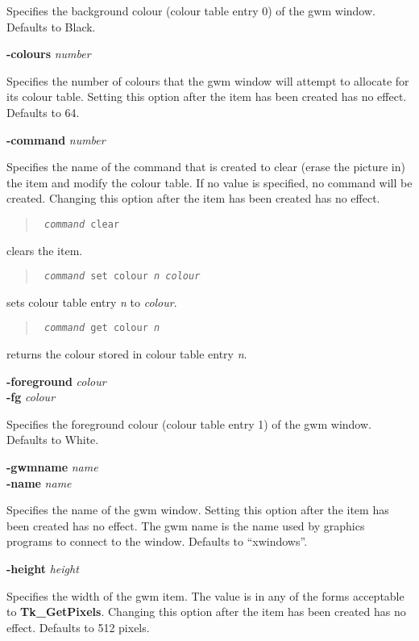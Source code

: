 \begin{rquote}
Specifies the background colour (colour table entry 0) of the gwm window.
Defaults to Black.
\end{rquote}

{\bf -colours} {\em number}
\begin{rquote}
Specifies the number of colours that the gwm window will attempt to allocate
for its colour table. Setting this option after the item has been created 
has no effect. Defaults to 64.
\end{rquote}

{\bf -command} {\em number}
\begin{rquote}
Specifies the name of the command that is created to clear (erase the picture
in) the item and modify the colour table. If no value is specified, no 
command will be created. Changing this option after the item has been created
has no effect.
\begin{quote}{\tt
{\em command} clear
}\end{quote}
clears the item.
\begin{quote}{\tt
{\em command} set colour {\em n} {\em colour}
}\end{quote}
sets colour table entry {\em n} to {\em colour}.
\begin{quote}{\tt
{\em command} get colour {\em n}
}\end{quote}
returns the colour stored in colour table entry {\em n}.
\end{rquote}

{\bf -foreground} {\em colour}\\
{\bf -fg} {\em colour}
\begin{rquote}
Specifies the foreground colour (colour table entry 1) of the gwm window.
Defaults to White.
\end{rquote}

{\bf -gwmname} {\em name}\\
{\bf -name} {\em name}
\begin{rquote}
Specifies the name of the gwm window. Setting
this option after the item has been created has no effect. The gwm name 
is the name used by graphics programs to connect to the window. Defaults
to ``xwindows''.
\end{rquote}

{\bf -height} {\em height}
\begin{rquote}
Specifies the width of the gwm item. The value is in any of the forms
acceptable to {\bf Tk\_GetPixels}. Changing this option after the item 
has been created has no effect. Defaults to 512 pixels.
\end{rquote}

